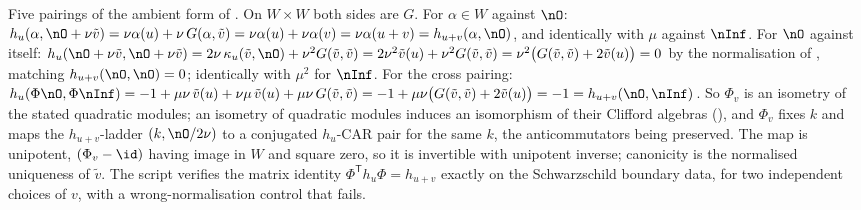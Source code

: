 Five pairings of the ambient form of . On $W \times W$ both sides are $G$. For $\alpha \in W$ against $\nO$: $h_u(\alpha, \nO + \nu\tilde v) = \nu\alpha(u) + \nu\,G(\alpha, \tilde v) = \nu\alpha(u) + \nu\alpha(v) = \nu\alpha(u + v) = h_{u+v}(\alpha, \nO)$, and identically with $\mu$ against $\nInf$. For $\nO$ against itself: $h_u(\nO + \nu\tilde v, \nO + \nu\tilde v) = 2\nu\,\kappa_u(\tilde v, \nO) + \nu^2 G(\tilde v, \tilde v) = 2\nu^2\tilde v(u) + \nu^2 G(\tilde v, \tilde v) = \nu^2\bigl(G(\tilde v,\tilde v) + 2\tilde v(u)\bigr) = 0$ by the normalisation of , matching $h_{u+v}(\nO, \nO) = 0$; identically with $\mu^2$ for $\nInf$. For the cross pairing: $h_u(\Phi\nO, \Phi\nInf) = -1 + \mu\nu\,\tilde v(u) + \nu\mu\,\tilde v(u) + \mu\nu\,G(\tilde v, \tilde v) = -1 + \mu\nu\bigl(G(\tilde v, \tilde v) + 2\tilde v(u)\bigr) = -1 = h_{u+v}(\nO, \nInf)$. So $\Phi_v$ is an isometry of the stated quadratic modules; an isometry of quadratic modules induces an isomorphism of their Clifford algebras (), and $\Phi_v$ fixes $k$ and maps the $h_{u+v}$-ladder $(k, \nO/2\nu)$ to a conjugated $h_u$-CAR pair for the same $k$, the anticommutators being preserved. The map is unipotent, $(\Phi_v - \id)$ having image in $W$ and square zero, so it is invertible with unipotent inverse; canonicity is the normalised uniqueness of $\tilde v$. The script verifies the matrix identity $\Phi^{\mathsf{T}} h_u \Phi = h_{u+v}$ exactly on the Schwarzschild boundary data, for two independent choices of $v$, with a wrong-normalisation control that fails.
